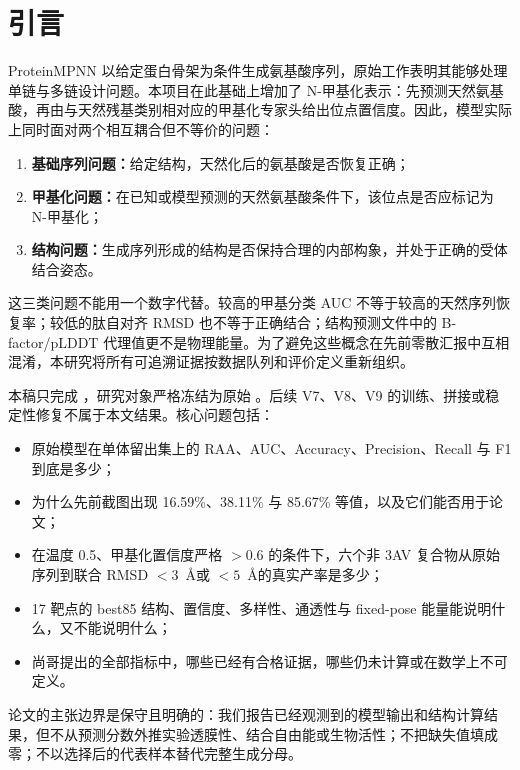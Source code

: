 \section{引言}

ProteinMPNN 以给定蛋白骨架为条件生成氨基酸序列，原始工作表明其能够处理单链与多链设计问题\cite{dauparas2022proteinmpnn}。本项目在此基础上增加了 N-甲基化表示：先预测天然氨基酸，再由与天然残基类别相对应的甲基化专家头给出位点置信度。因此，模型实际上同时面对两个相互耦合但不等价的问题：

\begin{enumerate}
  \item \textbf{基础序列问题：}给定结构，天然化后的氨基酸是否恢复正确；
  \item \textbf{甲基化问题：}在已知或模型预测的天然氨基酸条件下，该位点是否应标记为 N-甲基化；
  \item \textbf{结构问题：}生成序列形成的结构是否保持合理的内部构象，并处于正确的受体结合姿态。
\end{enumerate}

这三类问题不能用一个数字代替。较高的甲基分类 AUC 不等于较高的天然序列恢复率；较低的肽自对齐 RMSD 也不等于正确结合；结构预测文件中的 B-factor/pLDDT 代理值更不是物理能量。为了避免这些概念在先前零散汇报中互相混淆，本研究将所有可追溯证据按数据队列和评价定义重新组织。

本稿只完成 \taskone，研究对象严格冻结为原始 。后续 V7、V8、V9 的训练、拼接或稳定性修复不属于本文结果。核心问题包括：

\begin{itemize}
  \item 原始模型在单体留出集上的 RAA、AUC、Accuracy、Precision、Recall 与 F1 到底是多少；
  \item 为什么先前截图出现 16.59\%、38.11\% 与 85.67\% 等值，以及它们能否用于论文；
  \item 在温度 0.5、甲基化置信度严格 $>0.6$ 的条件下，六个非 3AV 复合物从原始序列到联合 RMSD $<3$~\AA 或 $<5$~\AA 的真实产率是多少；
  \item 17 靶点的 best85 结构、置信度、多样性、通透性与 fixed-pose 能量能说明什么，又不能说明什么；
  \item 尚哥提出的全部指标中，哪些已经有合格证据，哪些仍未计算或在数学上不可定义。
\end{itemize}

论文的主张边界是保守且明确的：我们报告已经观测到的模型输出和结构计算结果，但不从预测分数外推实验透膜性、结合自由能或生物活性；不把缺失值填成零；不以选择后的代表样本替代完整生成分母。
